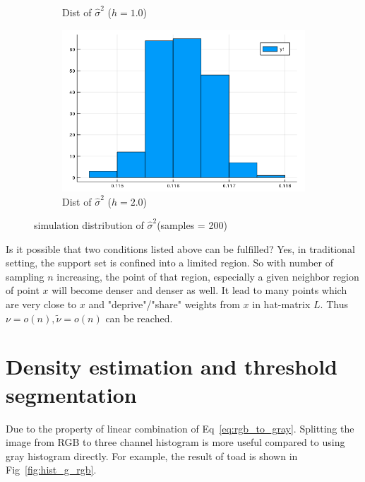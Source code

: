 \documentclass{article}
\begin{document}
\begin{figure}[htb]
\begin{subfigure}[b]{0.4\linewidth}
    \caption{Dist of $\hat{\sigma}^2$ ($h=1.0$)}
  \end{subfigure}
  \begin{subfigure}[b]{0.4\linewidth}
    \includegraphics[width=\linewidth]{images/std_est_4.png}
    \caption{Dist of $\hat{\sigma}^2$ ($h=2.0$)}
  \end{subfigure}
  \caption{simulation distribution of $\hat{\sigma}^2$(samples = 200)}
  \label{fig:std_est}
\end{figure}

Is it possible that two conditions listed above can be fulfilled? Yes, in traditional setting,
the support set is confined into a limited region. So with number of sampling $n$ increasing,
the point of that region, especially a given neighbor region of point $x$ will become denser and denser as well.
It lead to many points which are very close to $x$ and "deprive"/"share" weights from $x$ in hat-matrix $L$.
Thus $\nu=o(n),\tilde{\nu}=o(n)$ can be reached.

\section{Density estimation and threshold segmentation}

\label{segmentation}

Due to the property of linear combination of Eq~\ref{eq:rgb_to_gray}. Splitting the image from RGB to three channel histogram is more useful
compared to using gray histogram directly. For example, the result of toad is shown in Fig~\ref{fig:hist_g_rgb}.
\end{document}
